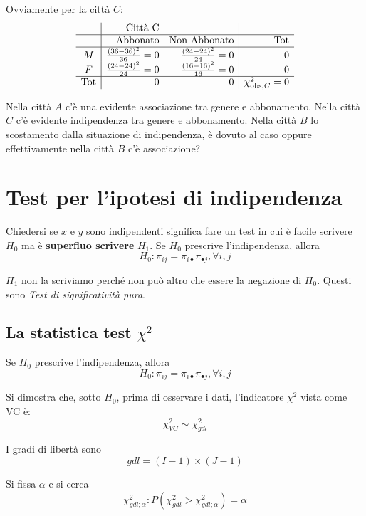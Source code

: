 \documentclass[
  11pt,
]{book}
\theoremstyle{mytheoremstyle}
\theoremstyle{mydefstyle}
\begin{document}
Ovviamente per la città \(C\):
\[
\begin{array}{c|rr|r}
 & \text{Città C} & &\\ \hline
 &\text{Abbonato} &\text{Non Abbonato} &\bf\text{Tot}\\
  \hline
  M & \frac{(36 - 36)^2}{36} = 0 & \frac{(24 - 24)^2}{24} = 0 & 0\\ 
  F & \frac{(24 - 24)^2}{24} = 0 & \frac{(16 - 16)^2}{16} = 0  & 0\\ \hline
    \bf\text{Tot} &0 &0 &\chi^2_{\text{obs},C}=0\\ 
\end{array}
\]

Nella città \(A\) c'è una evidente associazione tra genere e abbonamento.
Nella città \(C\) c'è evidente indipendenza tra genere e abbonamento.
Nella città \(B\) lo scostamento dalla situazione di indipendenza, è dovuto al caso
oppure effettivamente nella città \(B\) c'è associazione?

\section{Test per l'ipotesi di indipendenza}\label{test-per-lipotesi-di-indipendenza}

Chiedersi se \(x\) e \(y\) sono indipendenti significa fare un test in cui è facile scrivere
\(H_0\) ma è \textbf{superfluo scrivere} \(H_1\).
Se \(H_0\) prescrive l'indipendenza, allora
\[H_0:\pi_{ij}=\pi_{i\bullet}\pi_{\bullet j}, \forall i,j\]

\(H_1\) non la scriviamo perché non può altro che essere la negazione di \(H_0\).
Questi sono \emph{Test di significatività pura}.

\subsection{\texorpdfstring{La statistica test \(\chi^2\)}{La statistica test \textbackslash chi\^{}2}}\label{la-statistica-test-chi2}

Se \(H_0\) prescrive l'indipendenza, allora
\[H_0:\pi_{ij}=\pi_{i\bullet}\pi_{\bullet j}, \forall i,j\]

Si dimostra che, sotto \(H_0\), prima di osservare i dati, l'indicatore \(\chi^2\)
vista come VC è:
\[\chi_{{VC}}^2\sim\chi^2_{gdl}\]

I gradi di libertà sono
\[gdl=(I-1)\times(J-1)\]

Si fissa \(\alpha\) e si cerca
\[\chi_{gdl;\alpha}^2:P(\chi_{gdl}^2>\chi_{gdl;\alpha}^2)=\alpha\]
\end{document}

